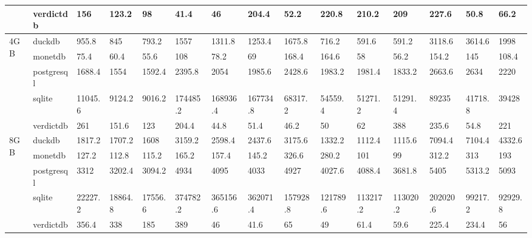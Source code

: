 \begin{table}[]
\begin{tabular}{ll|lllllllllllll}
                     & verdictdb  & 156     & 123.2   & 98      & 41.4     & 46       & 204.4    & 52.2     & 220.8    & 210.2    & 209      & 227.6    & 50.8    & 66.2    \\ \hline
\multirow{5}{*}{4GB} & duckdb     & 955.8   & 845     & 793.2   & 1557     & 1311.8   & 1253.4   & 1675.8   & 716.2    & 591.6    & 591.2    & 3118.6   & 3614.6  & 1998    \\
                     & monetdb    & 75.4    & 60.4    & 55.6    & 108      & 78.2     & 69       & 168.4    & 164.6    & 58       & 56.2     & 154.2    & 145     & 108.4   \\
                     & postgresql & 1688.4  & 1554    & 1592.4  & 2395.8   & 2054     & 1985.6   & 2428.6   & 1983.2   & 1981.4   & 1833.2   & 2663.6   & 2634    & 2220    \\
                     & sqlite     & 11045.6 & 9124.2  & 9016.2  & 174485.2 & 168936.4 & 167734.8 & 68317.2  & 54559.4  & 51271.2  & 51291.4  & 89235    & 41718.8 & 39428   \\
                     & verdictdb  & 261     & 151.6   & 123     & 204.4    & 44.8     & 51.4     & 46.2     & 50       & 62       & 388      & 235.6    & 54.8    & 221     \\ \hline
\multirow{5}{*}{8GB} & duckdb     & 1817.2  & 1707.2  & 1608    & 3159.2   & 2598.4   & 2437.6   & 3175.6   & 1332.2   & 1112.4   & 1115.6   & 7094.4   & 7104.4  & 4332.6  \\
                     & monetdb    & 127.2   & 112.8   & 115.2   & 165.2    & 157.4    & 145.2    & 326.6    & 280.2    & 101      & 99       & 312.2    & 313     & 193     \\
                     & postgresql & 3312    & 3202.4  & 3094.2  & 4934     & 4095     & 4033     & 4927     & 4027.6   & 4088.4   & 3681.8   & 5405     & 5313.2  & 5093    \\
                     & sqlite     & 22227.2 & 18864.8 & 17556.6 & 374782.2 & 365156.6 & 362071.4 & 157928.8 & 121789.6 & 113217.2 & 113020.2 & 202020.6 & 99217.2 & 92929.8 \\
                     & verdictdb  & 356.4   & 338     & 185     & 389      & 46       & 41.6     & 65       & 49       & 61.4     & 59.6     & 225.4    & 234.4   & 56     
\end{tabular}
\end{table}
